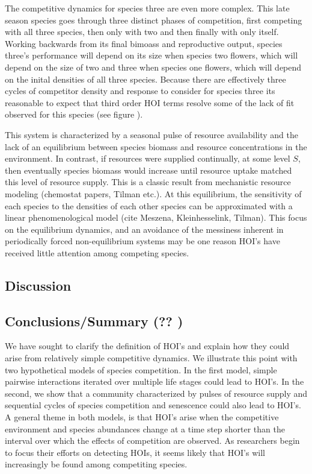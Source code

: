 \documentclass[12pt,]{article}
\begin{document}
The competitive dynamics for species three are even more complex. This
late season species goes through three distinct phases of competition,
first competing with all three species, then only with two and then
finally with only itself. Working backwards from its final bimoass and
reproductive output, species three's performance will depend on its size
when species two flowers, which will depend on the size of two and three
when species one flowers, which will depend on the inital densities of
all three species. Because there are effectively three cycles of
competitor density and response to consider for species three its
reasonable to expect that third order HOI terms resolve some of the lack
of fit observed for this species (see figure ).

This system is characterized by a seasonal pulse of resource
availability and the lack of an equilibrium between species biomass and
resource concentrations in the environment. In contrast, if resources
were supplied continually, at some level \(S\), then eventually species
biomass would increase until resource uptake matched this level of
resource supply. This is a classic result from mechanistic resource
modeling (chemostat papers, Tilman etc.). At this equilibrium, the
sensitivity of each species to the densities of each other species can
be approximated with a linear phenomenological model (cite Meszena,
Kleinhesselink, Tilman). This focus on the equilibrium dynamics, and an
avoidance of the messiness inherent in periodically forced
non-equilibrium systems may be one reason HOI's have received little
attention among competing species.

\subsection{Discussion}\label{discussion}

\subsection{Conclusions/Summary (?? )}\label{conclusionssummary}

We have sought to clarify the definition of HOI's and explain how they
could arise from relatively simple competitive dynamics. We illustrate
this point with two hypothetical models of species competition. In the
first model, simple pairwise interactions iterated over multiple life
stages could lead to HOI's. In the second, we show that a community
characterized by pulses of resource supply and sequential cycles of
species competition and senescence could also lead to HOI's. A general
theme in both models, is that HOI's arise when the competitive
environment and species abundances change at a time step shorter than
the interval over which the effects of competition are observed. As
researchers begin to focus their efforts on detecting HOIs, it seems
likely that HOI's will increasingly be found among competiting species.
\end{document}
